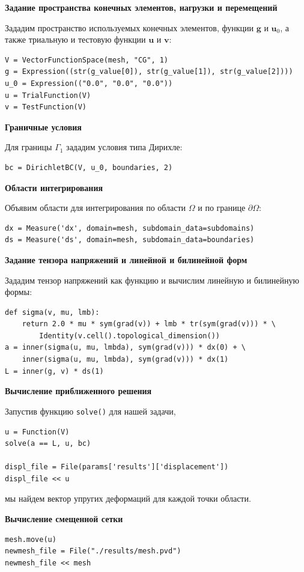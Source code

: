 \documentclass[a4paper, 14pt]{extreport}
\begin{document}
\textbf{Задание пространства конечных элементов, нагрузки и перемещений}

Зададим пространство используемых конечных элементов,
функции $\textbf{g}$ и $\textbf{u}_0$, а также триальную и тестовую
функции $\textbf{u}$ и $\textbf{v}$:
\begin{lstlisting}
V = VectorFunctionSpace(mesh, "CG", 1)
g = Expression((str(g_value[0]), str(g_value[1]), str(g_value[2])))
u_0 = Expression(("0.0", "0.0", "0.0"))
u = TrialFunction(V)
v = TestFunction(V)
\end{lstlisting}

\textbf{Граничные условия}

Для границы $\Gamma_1$ зададим условия типа Дирихле:
\begin{lstlisting}
bc = DirichletBC(V, u_0, boundaries, 2)
\end{lstlisting}

\textbf{Области интегрирования}

Объявим области для интегрирования по области $\Omega$ и по границе
$\partial\Omega$:
\begin{lstlisting}
dx = Measure('dx', domain=mesh, subdomain_data=subdomains)
ds = Measure('ds', domain=mesh, subdomain_data=boundaries)
\end{lstlisting}

\textbf{Задание тензора напряжений и линейной и билинейной форм}

Зададим тензор напряжений как функцию и вычислим линейную и билинейную формы:
\begin{lstlisting}
def sigma(v, mu, lmb):
    return 2.0 * mu * sym(grad(v)) + lmb * tr(sym(grad(v))) * \
        Identity(v.cell().topological_dimension())
a = inner(sigma(u, mu, lmbda), sym(grad(v))) * dx(0) + \
    inner(sigma(u, mu, lmbda), sym(grad(v))) * dx(1)
L = inner(g, v) * ds(1)
\end{lstlisting}

\textbf{Вычисление приближенного решения}

Запустив функцию \texttt{solve()} для нашей задачи,
\begin{lstlisting}
u = Function(V)
solve(a == L, u, bc)

displ_file = File(params['results']['displacement'])
displ_file << u
\end{lstlisting}
мы найдем вектор упругих деформаций для каждой точки области.

\textbf{Вычисление смещенной сетки}

\begin{lstlisting}
mesh.move(u)
newmesh_file = File("./results/mesh.pvd")
newmesh_file << mesh
\end{lstlisting}
\end{document}
